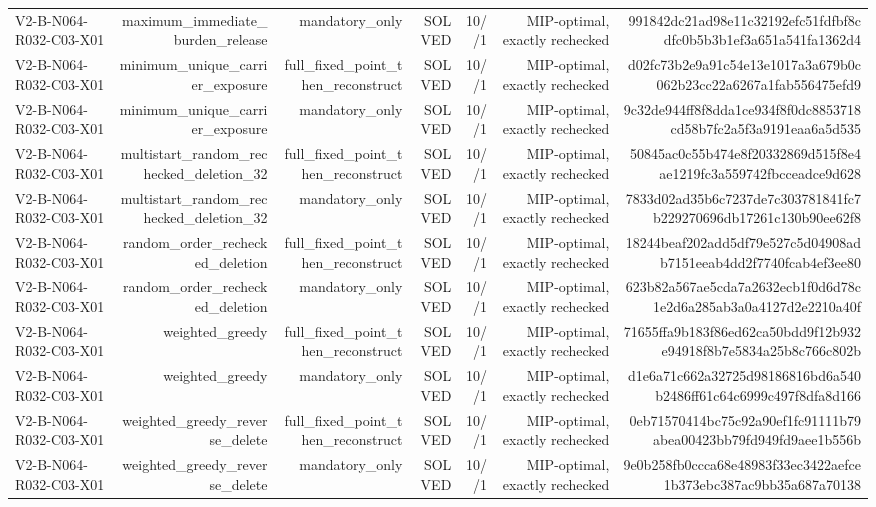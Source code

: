 {\begin{longtable}{lrrrrrr}
V2-B-N064-R032-C03-X01 & maximum\_immediate\_burden\_release & mandatory\_only & SOLVED & 10//1 & MIP-optimal, exactly rechecked & 991842dc21ad98e11c32192efc51fdfbf8cdfc0b5b3b1ef3a651a541fa1362d4 \\
V2-B-N064-R032-C03-X01 & minimum\_unique\_carrier\_exposure & full\_fixed\_point\_then\_reconstruct & SOLVED & 10//1 & MIP-optimal, exactly rechecked & d02fc73b2e9a91c54e13e1017a3a679b0c062b23cc22a6267a1fab556475efd9 \\
V2-B-N064-R032-C03-X01 & minimum\_unique\_carrier\_exposure & mandatory\_only & SOLVED & 10//1 & MIP-optimal, exactly rechecked & 9c32de944ff8f8dda1ce934f8f0dc8853718cd58b7fc2a5f3a9191eaa6a5d535 \\
V2-B-N064-R032-C03-X01 & multistart\_random\_rechecked\_deletion\_32 & full\_fixed\_point\_then\_reconstruct & SOLVED & 10//1 & MIP-optimal, exactly rechecked & 50845ac0c55b474e8f20332869d515f8e4ae1219fc3a559742fbcceadce9d628 \\
V2-B-N064-R032-C03-X01 & multistart\_random\_rechecked\_deletion\_32 & mandatory\_only & SOLVED & 10//1 & MIP-optimal, exactly rechecked & 7833d02ad35b6c7237de7c303781841fc7b229270696db17261c130b90ee62f8 \\
V2-B-N064-R032-C03-X01 & random\_order\_rechecked\_deletion & full\_fixed\_point\_then\_reconstruct & SOLVED & 10//1 & MIP-optimal, exactly rechecked & 18244beaf202add5df79e527c5d04908adb7151eeab4dd2f7740fcab4ef3ee80 \\
V2-B-N064-R032-C03-X01 & random\_order\_rechecked\_deletion & mandatory\_only & SOLVED & 10//1 & MIP-optimal, exactly rechecked & 623b82a567ae5cda7a2632ecb1f0d6d78c1e2d6a285ab3a0a4127d2e2210a40f \\
V2-B-N064-R032-C03-X01 & weighted\_greedy & full\_fixed\_point\_then\_reconstruct & SOLVED & 10//1 & MIP-optimal, exactly rechecked & 71655ffa9b183f86ed62ca50bdd9f12b932e94918f8b7e5834a25b8c766c802b \\
V2-B-N064-R032-C03-X01 & weighted\_greedy & mandatory\_only & SOLVED & 10//1 & MIP-optimal, exactly rechecked & d1e6a71c662a32725d98186816bd6a540b2486ff61c64c6999c497f8dfa8d166 \\
V2-B-N064-R032-C03-X01 & weighted\_greedy\_reverse\_delete & full\_fixed\_point\_then\_reconstruct & SOLVED & 10//1 & MIP-optimal, exactly rechecked & 0eb71570414bc75c92a90ef1fc91111b79abea00423bb79fd949fd9aee1b556b \\
V2-B-N064-R032-C03-X01 & weighted\_greedy\_reverse\_delete & mandatory\_only & SOLVED & 10//1 & MIP-optimal, exactly rechecked & 9e0b258fb0ccca68e48983f33ec3422aefce1b373ebc387ac9bb35a687a70138 \\

\end{longtable}}
